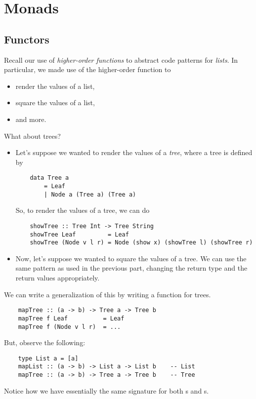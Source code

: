 \documentclass[letterpaper]{article}
\begin{document}
\section{Monads}

\subsection{Functors}
Recall our use of \emph{higher-order functions} to abstract code patterns for \emph{lists}. In particular, we made use of the  higher-order function to 
\begin{itemize}
    \item render the values of a list, 
    \item square the values of a list,
    \item and more.
\end{itemize}
What about trees? 
\begin{itemize}
    \item Let's suppose we wanted to render the values of a \emph{tree}, where a tree is defined by 
    \begin{verbatim}
    data Tree a 
        = Leaf 
        | Node a (Tree a) (Tree a)\end{verbatim}
    So, to render the values of a tree, we can do 
    \begin{verbatim}
    showTree :: Tree Int -> Tree String
    showTree Leaf         = Leaf 
    showTree (Node v l r) = Node (show x) (showTree l) (showTree r)\end{verbatim}

    \item Now, let's suppose we wanted to square the values of a tree. We can use the same pattern as used in the previous part, changing the return type and the return values appropriately.
\end{itemize}

We can write a generalization of this by writing a  function for trees. 
\begin{verbatim}
    mapTree :: (a -> b) -> Tree a -> Tree b
    mapTree f Leaf          = Leaf 
    mapTree f (Node v l r)  = ... \end{verbatim}
But, observe the following: 
\begin{verbatim}
    type List a = [a]
    mapList :: (a -> b) -> List a -> List b    -- List
    mapTree :: (a -> b) -> Tree a -> Tree b    -- Tree\end{verbatim}
Notice how we have essentially the same signature for both s and s. 
\end{document}
